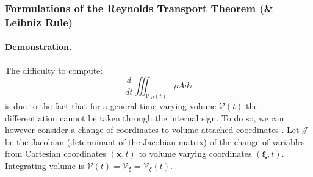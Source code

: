 \subsubsection{Formulations of the Reynolds Transport Theorem (\& Leibniz Rule)}
\paragraph{Demonstration.}
The difficulty to compute:
\begin{equation}
 \displaystyle
 \frac{d}{dt} \iiint_{\mathcal{V}_M(t)} \rho A d\tau
\end{equation}
is due to the fact that for a general time-varying volume $\mathcal{V}(t)$ the differentiation cannot be taken through the internal sign. To do so, we can however consider a change of coordinates to volume-attached coordinates \citep{hirasaki_chapter_2021}. Let $\mathcal{J}$ be the Jacobian (determinant of the Jacobian matrix) of the change of variables from Cartesian coordinates $(\mathbf{x},t)$ to volume varying coordinates $(\boldsymbol{\xi},t)$. Integrating volume is $\mathcal{V}(t)=\mathcal{V}_{\xi}=\mathcal{V}_{\xi}(t)$.

